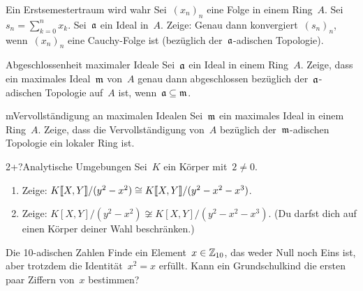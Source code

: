 \documentclass[entwurf]{uebblatt}
\begin{document}

\begin{aufgabe}{3}{Ein Erstsemestertraum wird wahr}
Sei~$(x_n)_n$ eine Folge in einem Ring~$A$. Sei~$s_n = \sum_{k=0}^n x_k$.
Sei~$\mathfrak{a}$ ein Ideal in~$A$. Zeige: Genau dann konvergiert~$(s_n)_n$,
wenn~$(x_n)_n$ eine Cauchy-Folge ist (bezüglich der~$\mathfrak{a}$-adischen Topologie).
\end{aufgabe}


\begin{aufgabe}{3}{Abgeschlossenheit maximaler Ideale}
Sei~$\mathfrak{a}$ ein Ideal in einem Ring~$A$. Zeige, dass ein maximales Ideal~$\mathfrak{m}$
von~$A$ genau dann abgeschlossen bezüglich der~$\mathfrak{a}$-adischen Topologie
auf~$A$ ist, wenn~$\mathfrak{a} \subseteq \mathfrak{m}$.
\end{aufgabe}

\begin{aufgabe}{m}{Vervollständigung an maximalen Idealen}
Sei~$\mathfrak{m}$ ein maximales Ideal in einem Ring~$A$. Zeige, dass die
Vervollständigung von~$A$ bezüglich der~$\mathfrak{m}$-adischen Topologie ein lokaler
Ring ist.
\end{aufgabe}

\begin{aufgabe}{2+?}{Analytische Umgebungen}
Sei~$K$ ein Körper mit~$2 \neq 0$.
\begin{enumerate}
\item Zeige: ${K}\llbracket{X,Y}\rrbracket/(y^2-x^2) \cong {K}\llbracket{X,Y}\rrbracket/(y^2-x^2-x^3)$.
\item Zeige: $K[X,Y]/(y^2-x^2) \not\cong K[X,Y]/(y^2-x^2-x^3)$. (Du darfst dich
auf einen Körper deiner Wahl beschränken.)
\end{enumerate}
\end{aufgabe}

\begin{aufgabe}{0}{Die 10-adischen Zahlen}
Finde ein Element~$x \in \mathbb{Z}_{10}$, das weder Null noch Eins ist, aber trotzdem
die Identität~$x^2 = x$ erfüllt. Kann ein Grundschulkind die ersten paar
Ziffern von~$x$ bestimmen?
\end{aufgabe}
\end{document}
